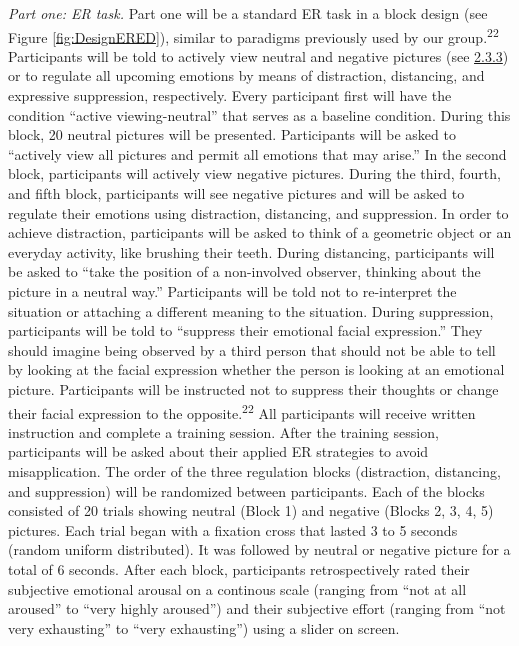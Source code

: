 \documentclass[
  english,
  man,floatsintext]{apa6}
\begin{document}
\emph{Part one: ER task.} Part one will be a standard ER task in a block design (see Figure \ref{fig:DesignERED}), similar to paradigms previously used by our group.\textsuperscript{22}
Participants will be told to actively view neutral and negative pictures (see \protect\hyperlink{ux5cux23stimuli}{2.3.3}) or to regulate all upcoming emotions by means of distraction, distancing, and expressive suppression, respectively.
Every participant first will have the condition ``active viewing-neutral'' that serves as a baseline condition.
During this block, 20 neutral pictures will be presented.
Participants will be asked to ``actively view all pictures and permit all emotions that may arise.''
In the second block, participants will actively view negative pictures.
During the third, fourth, and fifth block, participants will see negative pictures and will be asked to regulate their emotions using distraction, distancing, and suppression.
In order to achieve distraction, participants will be asked to think of a geometric object or an everyday activity, like brushing their teeth.
During distancing, participants will be asked to ``take the position of a non-involved observer, thinking about the picture in a neutral way.''
Participants will be told not to re-interpret the situation or attaching a different meaning to the situation.
During suppression, participants will be told to ``suppress their emotional facial expression.''
They should imagine being observed by a third person that should not be able to tell by looking at the facial expression whether the person is looking at an emotional picture.
Participants will be instructed not to suppress their thoughts or change their facial expression to the opposite.\textsuperscript{22}
All participants will receive written instruction and complete a training session.
After the training session, participants will be asked about their applied ER strategies to avoid misapplication.
The order of the three regulation blocks (distraction, distancing, and suppression) will be randomized between participants.
Each of the blocks consisted of 20 trials showing neutral (Block 1) and negative (Blocks 2, 3, 4, 5) pictures.
Each trial began with a fixation cross that lasted 3 to 5 seconds (random uniform distributed).
It was followed by neutral or negative picture for a total of 6 seconds.
After each block, participants retrospectively rated their subjective emotional arousal on a continous scale (ranging from ``not at all aroused'' to ``very highly aroused'') and their subjective effort (ranging from ``not very exhausting'' to ``very exhausting'') using a slider on screen.
\end{document}
